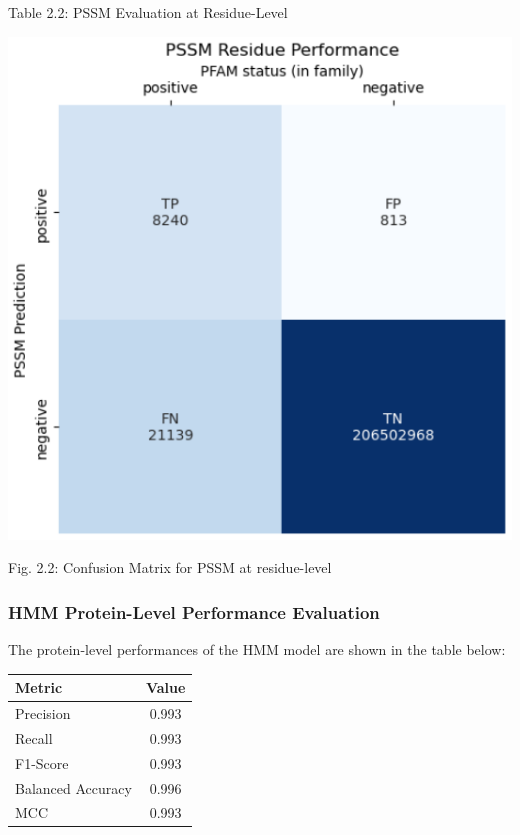 \documentclass[10pt,twocolumn,letterpaper]{article}
\begin{document}
\begin{center}
    \small{Table 2.2: PSSM Evaluation at Residue-Level}
\end{center}

\begin{center}
    \includegraphics[scale=0.45]{report/img/pssm_res_performance.png}
\end{center}

\begin{center}
    \small{Fig. 2.2: Confusion Matrix for PSSM at residue-level}
\end{center}

\subsubsection{HMM Protein-Level Performance Evaluation}


The protein-level performances of the HMM model are shown in the table below:

\begin{center}
    \begin{tabular}{lc}
        \toprule
        Metric & Value \\
        \midrule
        Precision & 0.993 \\
        Recall & 0.993 \\
        F1-Score & 0.993 \\
        Balanced Accuracy & 0.996 \\
        MCC & 0.993 \\
        \bottomrule
    \end{tabular}
\end{center} \\
\end{document}
